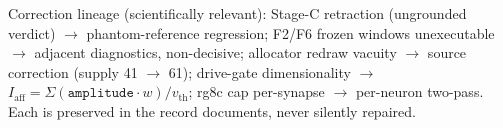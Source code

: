 Correction lineage (scientifically relevant):
Stage-C retraction (ungrounded verdict) \(\to\) phantom-reference
regression; F2/F6 frozen windows unexecutable \(\to\) adjacent
diagnostics, non-decisive; allocator redraw vacuity \(\to\) source
correction (supply 41 \(\to\) 61); drive-gate dimensionality \(\to\)
\(I_{\mathrm{aff}} = \Sigma(\texttt{amplitude}\cdot w)/v_{\mathrm{th}}\); rg8c
cap per-synapse \(\to\) per-neuron two-pass. Each is preserved in the
record documents, never silently repaired.